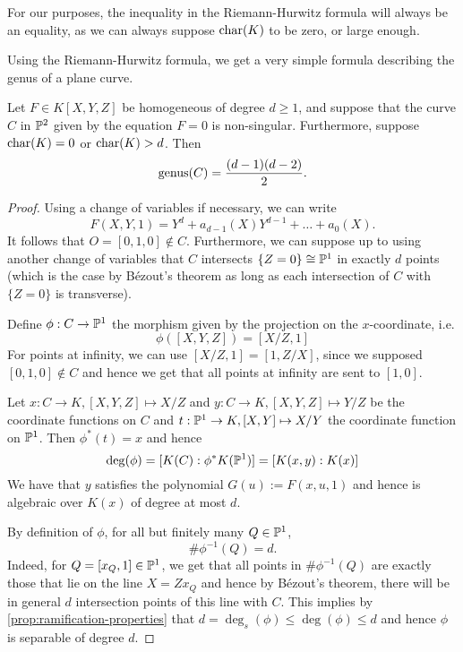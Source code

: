 For our purposes, the inequality in the Riemann-Hurwitz formula
will always be an equality, as we can always suppose $\operatorname{char}(K)$ to be
zero, or large enough.

Using the Riemann-Hurwitz formula, we get a very simple formula describing
the genus of a plane curve.
\begin{corollary}
	\label{cor:genus-formula}
	Let $F \in K[X, Y, Z]$ be homogeneous of degree $d \geq 1$, and suppose that
	the curve $C$ in $\mathbb{P}^2$ given by the equation $F = 0$ is non-singular.
	Furthermore, suppose $\operatorname{char}(K) = 0$ or $\operatorname{char}(K) > d$.
	Then
	\begin{equation*}
		\operatorname{genus}(C) = \frac{(d-1)(d-2)}{2}.
	\end{equation*}
\end{corollary}

\begin{proof}
	Using a change of variables if necessary, we can write
	\begin{equation*}
		F(X, Y, 1) = Y^d + a_{d-1}(X)Y^{d-1} + \dots + a_0(X).
	\end{equation*}
	It follows that $O = [0, 1, 0] \notin C$. Furthermore, we can suppose
	up to using another change of variables that
	$C$ intersects $\{Z = 0\} \cong \mathbb{P}^1$
	in exactly $d$ points (which is the case
	by Bézout's theorem as long as each intersection of $C$ with $\{Z = 0\}$
	is transverse).

	Define $\phi: C \to \mathbb{P}^1$ the morphism given 
	by the projection on the $x$-coordinate, i.e.
	\begin{equation*}
		\phi([X, Y, Z]) = [X/Z, 1]
	\end{equation*}
	For points at infinity, we can use $[X/Z, 1] = [1, Z/X]$, since we supposed
	$[0, 1, 0] \notin C$ and hence we get that all points at infinity are sent
	to $[1, 0]$.

	Let $x: C \to K, [X, Y, Z] \mapsto X/Z$ and $y: C \to K, [X, Y, Z] \mapsto
	Y/Z$ be the coordinate functions on $C$ and $t:\mathbb{P}^1\to K, [X, Y] \mapsto
	X/Y$ the coordinate function on $\mathbb{P}^1$.
	Then $\phi^*(t) = x$ and hence
	\begin{equation*}
		\deg(\phi) = [K(C) : \phi^*K(\mathbb{P}^1)] = [K(x, y): K(x)]
	\end{equation*}
	We have that $y$ satisfies the polynomial $G(u) := F(x, u, 1)$ and hence is algebraic
	over $K(x)$ of degree at most $d$.

	By definition of $\phi$, for all but finitely many $Q \in \mathbb{P}^1$, 
	\begin{equation*}
		\#\phi^{-1}(Q) = d.
	\end{equation*}
	Indeed, for $Q = [x_Q, 1] \in \mathbb{P}^1$, we get that all points in
	$\#\phi^{-1}(Q)$ are exactly those that lie on the line $X = Zx_Q$
	and hence by Bézout's theorem, there will be in general $d$ intersection
	points of this line with $C$.
	This implies by \ref{prop:ramification-properties} that
	$d = \deg_s(\phi) \leq \deg(\phi) \leq d$ and hence $\phi$ is separable of
	degree $d$.


\end{proof}
